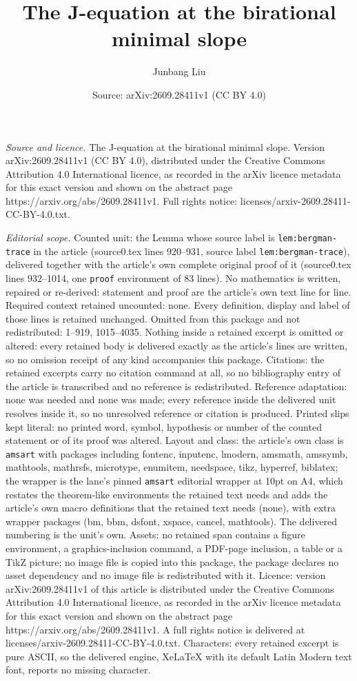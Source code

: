\documentclass[10pt,a4paper]{amsart}
\title[The J-equation at the birational minimal slope]{The J-equation at the birational minimal slope}
\author{Junbang Liu}
\date{Source: arXiv:2609.28411v1 (CC BY 4.0)}
\begin{document}
\maketitle

\noindent\emph{Source and licence.} The J-equation at the birational minimal slope. Version arXiv:2609.28411v1 (CC BY 4.0), distributed under the Creative Commons Attribution 4.0 International licence, as recorded in the arXiv licence metadata for this exact version and shown on the abstract page https://arxiv.org/abs/2609.28411v1. Full rights notice: licenses/arxiv-2609.28411-CC-BY-4.0.txt.\par\smallskip

\noindent\textit{Editorial scope.} Counted unit: the Lemma whose source label is \texttt{lem:bergman-trace} in the article (source0.tex lines 920--931, source label \texttt{lem:bergman-trace}), delivered together with the article's own complete original proof of it (source0.tex lines 932--1014, one \texttt{proof} environment of 83 lines). No mathematics is written, repaired or re-derived: statement and proof are the article's own text line for line. Required context retained uncounted: none. Every definition, display and label of those lines is retained unchanged. Omitted from this package and not redistributed: 1--919, 1015--4035. Nothing inside a retained excerpt is omitted or altered: every retained body is delivered exactly as the article's lines are written, so no omission receipt of any kind accompanies this package. Citations: the retained excerpts carry no citation command at all, so no bibliography entry of the article is transcribed and no reference is redistributed. Reference adaptation: none was needed and none was made; every reference inside the delivered unit resolves inside it, so no unresolved reference or citation is produced. Printed slips kept literal: no printed word, symbol, hypothesis or number of the counted statement or of its proof was altered. Layout and class: the article's own class is \texttt{amsart} with packages including fontenc, inputenc, lmodern, amsmath, amssymb, mathtools, mathrsfs, microtype, enumitem, needspace, tikz, hyperref, biblatex; the wrapper is the lane's pinned \texttt{amsart} editorial wrapper at 10pt on A4, which restates the theorem-like environments the retained text needs and adds the article's own macro definitions that the retained text needs (none), with extra wrapper packages (bm, bbm, dsfont, xspace, cancel, mathtools). The delivered numbering is the unit's own. Assets: no retained span contains a figure environment, a graphics-inclusion command, a PDF-page inclusion, a table or a TikZ picture; no image file is copied into this package, the package declares no asset dependency and no image file is redistributed with it. Licence: version arXiv:2609.28411v1 of this article is distributed under the Creative Commons Attribution 4.0 International licence, as recorded in the arXiv licence metadata for this exact version and shown on the abstract page https://arxiv.org/abs/2609.28411v1. A full rights notice is delivered at licenses/arxiv-2609.28411-CC-BY-4.0.txt. Characters: every retained excerpt is pure ASCII, so the delivered engine, XeLaTeX with its default Latin Modern text font, reports no missing character.
\end{document}
